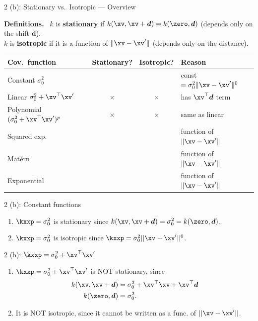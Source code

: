 \documentclass[aspectratio=169]{beamer}
\newcommand{\xvp}{\xv^\prime}
\newcommand{\dv}{\bm{d}}
\begin{document}
\begin{frame}{2 (b): Stationary vs.\ Isotropic --- Overview}
	\small
	\begin{tcolorbox}[colback=blue!4, colframe=blue!55!black, boxsep=2pt, left=5pt, right=5pt, top=3pt, bottom=3pt, arc=2pt]
	\footnotesize
	\textbf{Definitions.} \ $k$ is \textbf{stationary} if $k(\xv, \xv + \dv) = k(\zero, \dv)$ (depends only on the shift $\dv$).\\
	$k$ is \textbf{isotropic} if it is a function of $\|\xv - \xvp\|$ (depends only on the distance).
	\end{tcolorbox}
	\medskip
	\begin{center}
	\renewcommand{\arraystretch}{1.25}
	\begin{tabular}{@{}lccl@{}}
		\toprule
		\textbf{Cov.\ function} & \textbf{Stationary?} & \textbf{Isotropic?} & \textbf{Reason} \\
		\midrule
		Constant $\sigma_0^2$ & \checkmark & \checkmark & const $= \sigma_0^2\|\xv-\xvp\|^0$ \\
		Linear $\sigma_0^2 + \xv^\top\xvp$ & $\times$ & $\times$ & has $\xv^\top\dv$ term \\
		Polynomial $(\sigma_0^2+\xv^\top\xvp)^p$ & $\times$ & $\times$ & same as linear \\
		Squared exp. & \checkmark & \checkmark & function of $\|\xv-\xvp\|$ \\
		Mat\'ern & \checkmark & \checkmark & function of $\|\xv-\xvp\|$ \\
		Exponential & \checkmark & \checkmark & function of $\|\xv-\xvp\|$ \\
		\bottomrule
	\end{tabular}
	\end{center}
\end{frame}

\begin{frame}[t]{2 (b): Constant functions}
	\begin{enumerate}
		\item<1-> $\kxxp = \sigma_0^2$ is stationary since $k(\xv, \xv + \dv) = \sigma_0^2  = k(\zero, \dv)$.
		\item<2-> $\kxxp = \sigma_0^2$ is isotropic since $ \kxxp = \sigma_0^2||\xv - \xvp ||^0$.
	\end{enumerate}
\end{frame}

\begin{frame}[t]{2 (b): $\kxxp = \sigma_0^2 + \xv^\top \xvp$}
	\begin{enumerate}
		\item<1-> $\kxxp = \sigma_0^2 + \xv^\top \xvp$ is NOT stationary, since
		\begin{align*}
			k(\xv, \xv + \dv) &= \sigma_0^2 + \xv^\top \xv + \xv^\top \dv \\
			k(\zero, \dv) &= \sigma_0^2.
		\end{align*}
		\item<2-> It is NOT isotropic, since it cannot be written as a func. of $|| \xv - \xvp||$.
	\end{enumerate}
	\medskip
\end{frame}
\end{document}
